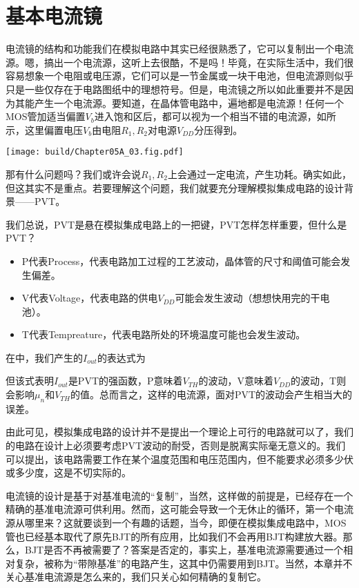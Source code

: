 \section{基本电流镜}
电流镜的结构和功能我们在模拟电路中其实已经很熟悉了，它可以复制出一个电流源。嗯，搞出一个电流源，这听上去很酷，不是吗！毕竟，在实际生活中，我们很容易想象一个电阻或电压源，它们可以是一节金属或一块干电池，但电流源则似乎只是一些仅存在于电路图纸中的理想符号。但是，电流镜之所以如此重要并不是因为其能产生一个电流源。要知道，在晶体管电路中，遍地都是电流源！任何一个MOS管加适当偏置$V_b$进入饱和区后，都可以视为一个相当不错的电流源，如所示，这里偏置电压$V_b$由电阻$R_1,R_2$对电源$V_{DD}$分压得到。

\vspace{0.25cm}
\begin{Figure}[朴素电流源]
    \texttt{[image: build/Chapter05A\_03.fig.pdf]}
\end{Figure}
\vspace{0.25cm}

那有什么问题吗？我们或许会说$R_1,R_2$上会通过一定电流，产生功耗。确实如此，但这其实不是重点。若要理解这个问题，我们就要充分理解模拟集成电路的设计背景——PVT。\goodbreak

我们总说，PVT是悬在模拟集成电路上的一把键，PVT怎样怎样重要，但什么是PVT？\nopagebreak
\begin{itemize}
    \item P代表Process，代表电路加工过程的工艺波动，晶体管的尺寸和阈值可能会发生偏差。
    \item V代表Voltage，代表电路的供电$V_{DD}$可能会发生波动（想想快用完的干电池）。
    \item T代表Tempreature，代表电路所处的环境温度可能也会发生波动。
\end{itemize}
在中，我们产生的$I_{out}$的表达式为
但该式表明$I_{out}$是PVT的强函数，P意味着$V_{TH}$的波动，V意味着$V_{DD}$的波动，T则会影响$\mu_n$和$V_{TH}$的值。总而言之，这样的电流源，面对PVT的波动会产生相当大的误差。

由此可见，模拟集成电路的设计并不是提出一个理论上可行的电路就可以了，我们的电路在设计上必须要考虑PVT波动的耐受，否则是脱离实际毫无意义的。我们可以提出，该电路需要工作在某个温度范围和电压范围内，但不能要求必须多少伏或多少度，这是不切实际的。

电流镜的设计是基于对基准电流的“复制”，当然，这样做的前提是，已经存在一个精确的基准电流源可供利用。然而，这可能会导致一个无休止的循环，第一个电流源从哪里来？这就要谈到一个有趣的话题，当今，即便在模拟集成电路中，MOS管也已经基本取代了原先BJT的所有应用，比如我们不会再用BJT构建放大器。那么，BJT是否不再被需要了？答案是否定的，事实上，基准电流源需要通过一个相对复杂，被称为“带隙基准”的电路产生，这其中仍需要用到BJT。当然，本章并不关心基准电流源是怎么来的，我们只关心如何精确的复制它。

